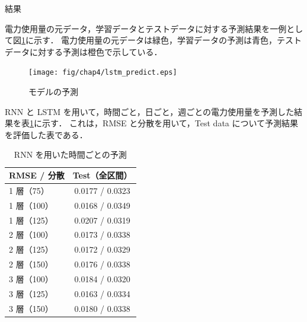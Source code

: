 \documentclass[twocolumn,fleqn,10pt]{jarticle}
\makeatletter
\renewcommand{\subsection}{\@startsection
{subsection}{3}{0mm}{5mm}{0.01pt}{\bfseries \normalsize}}
\makeatother
\begin{document}
\subsection{結果}



電力使用量の元データ，学習データとテストデータに対する予測結果を一例として図\ref{fig:lstm_predict}に示す．
電力使用量の元データは緑色，学習データの予測は青色，テストデータに対する予測は橙色で示している．






\begin{figure}[b]
  \texttt{[image: fig/chap4/lstm\_predict.eps]}
  \caption{モデルの予測}
  \label{fig:lstm_predict}
\end{figure}






RNN と LSTM を用いて，時間ごと，日ごと，週ごとの電力使用量を予測した結果を表\ref{tab:rnn-time}に示す．
これは，RMSE と分散を用いて，Test data について予測結果を評価した表である．





\begin{table}[t]
\centering
  \caption{RNN を用いた時間ごとの予測}
  \vspace{3mm}
  \begin{tabular}{|l||c|}  \hline
    RMSE / 分散 & Test（全区間） \\ \hline \hline
    1 層（75）  & 0.0177 / 0.0323 \\ \hline
    1 層（100） & 0.0168 / 0.0349 \\ \hline
    1 層（125） & 0.0207 / 0.0319 \\ \hline

    2 層（100） & 0.0173 / 0.0338 \\ \hline
    2 層（125） & 0.0172 / 0.0329 \\ \hline
    2 層（150） & 0.0176 / 0.0338 \\ \hline

    3 層（100） & 0.0184 / 0.0320 \\ \hline
    3 層（125） & 0.0163 / 0.0334 \\ \hline
    3 層（150） & 0.0180 / 0.0338 \\ \hline
  \end{tabular}
  \label{tab:rnn-time}
\end{table}
\end{document}
